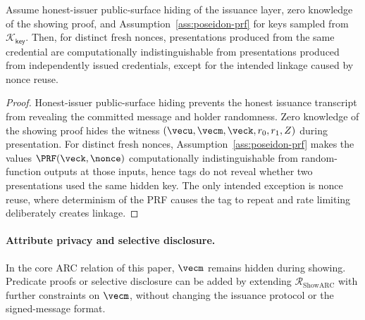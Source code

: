 \begin{proposition}\label{prop:arc-unlinkability}
Assume honest-issuer public-surface hiding of the issuance layer, zero knowledge of the showing proof, and
Assumption~\ref{ass:poseidon-prf} for keys sampled from $\mathcal K_{\mathsf{key}}$.  Then, for distinct fresh
nonces, presentations produced from the same credential are computationally indistinguishable from presentations
produced from independently issued credentials, except for the intended linkage caused by nonce reuse.
\end{proposition}

\begin{proof}
Honest-issuer public-surface hiding prevents the honest issuance transcript from revealing the committed message
and holder randomness.  Zero knowledge of the showing proof hides the witness
$(\vecu,\vecm,\veck,r_0,r_1,Z)$ during presentation.  For distinct fresh nonces, Assumption~\ref{ass:poseidon-prf}
makes the values $\PRF(\veck,\nonce)$ computationally indistinguishable from random-function outputs at those
inputs, hence tags do not reveal whether two presentations used the same hidden key.  The only intended exception
is nonce reuse, where determinism of the PRF causes the tag to repeat and rate limiting deliberately creates
linkage.
\end{proof}

\paragraph{Attribute privacy and selective disclosure.}
In the core ARC relation of this paper, $\vecm$ remains hidden during showing.  Predicate proofs or selective
disclosure can be added by extending $\mathcal R_{\mathrm{ShowARC}}$ with further constraints on $\vecm$, without
changing the issuance protocol or the signed-message format.
